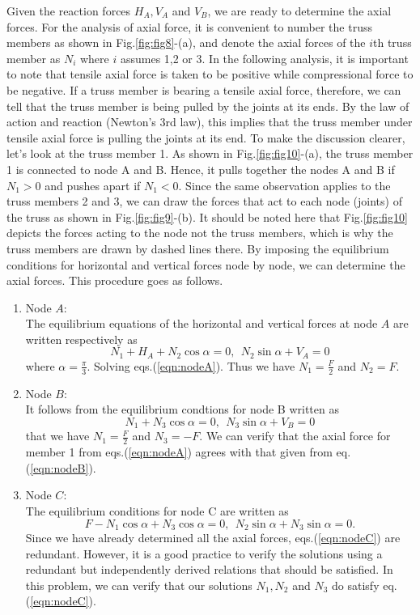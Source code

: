 ﻿\documentclass[10pt,a4j]{article}
\begin{document}
Given the reaction forces $H_A, V_A$ and $V_B$, we are ready to determine the axial forces. 
For the analysis of axial force, it is convenient to number the truss members as 
shown in Fig.\ref{fig:fig8}-(a), and denote the axial forces of the $i$th truss member 
as $N_i$ where $i$ assumes 1,2 or 3. 
In the following analysis, it is important to note that tensile axial force is taken to be 
positive while compressional force to be negative. If a truss member is bearing a tensile axial 
force, therefore, we can tell that the truss member is being pulled by the joints at its ends.
By the law of action and reaction (Newton's 3rd law), this implies that the truss member under  
tensile axial force is pulling the joints at its end. To make the discussion clearer, 
let's look at the truss member 1. As shown in Fig.\ref{fig:fig10}-(a), the truss member 1 is 
connected to node A and B. Hence, it pulls together the nodes A and B if $N_1>0$ and 
 pushes apart if $N_1<0$. 
 Since the same observation applies to the truss members 2 and 3, we can draw 
 the forces that act to each node (joints) of the truss as shown in Fig.\ref{fig:fig9}-(b).
It should be noted here that Fig.\ref{fig:fig10} depicts the forces acting to the node not 
the truss members, which is why the truss members are drawn by dashed lines there. 
By imposing the equilibrium conditions for horizontal and vertical forces node by node, 
we can determine the axial forces. This procedure goes as follows.
\begin{enumerate}
\item
	Node $A$: \\
	The equilibrium equations of the horizontal and vertical forces at node $A$
	are written respectively as 
	\begin{equation}
		N_1+H_A+N_2\cos\alpha=0, \ \ N_2\sin\alpha+V_A=0
		\label{eqn:nodeA}
	\end{equation}
	where $\alpha=\frac{\pi}{3}$. Solving eqs.(\ref{eqn:nodeA}). 
	Thus we have $N_1=\frac{F}{2}$ and $N_2=F$. 
\item
	Node $B$: \\
	It follows from the equilibrium condtions for node B written as 
	\begin{equation}
		N_1+N_3\cos\alpha=0, \ \ N_3\sin\alpha+V_B=0
		\label{eqn:nodeB}
	\end{equation}
	that we have $N_1=\frac{F}{2}$ and $N_3=-F$.
	We can verify that the axial force for member 1 from eqs.(\ref{eqn:nodeA}) 
	agrees with that given from eq.(\ref{eqn:nodeB}).
\item
	Node $C$: \\
	The equilibrium conditions for node C are written as 
	\begin{equation}
		F-N_1\cos\alpha+N_3\cos\alpha=0, \ \ N_2\sin\alpha+N_3\sin\alpha=0.
		\label{eqn:nodeC}
	\end{equation}
	Since we have already determined all the axial forces, eqs.(\ref{eqn:nodeC}) are redundant.  
	However, it is a good practice to verify the solutions using a redundant 
	but independently derived relations that should be satisfied.  
	In this problem, we can verify that our solutions $N_1,N_2$ and $N_3$ do 
	satisfy eq.(\ref{eqn:nodeC}).
\end{enumerate}
\end{document}
